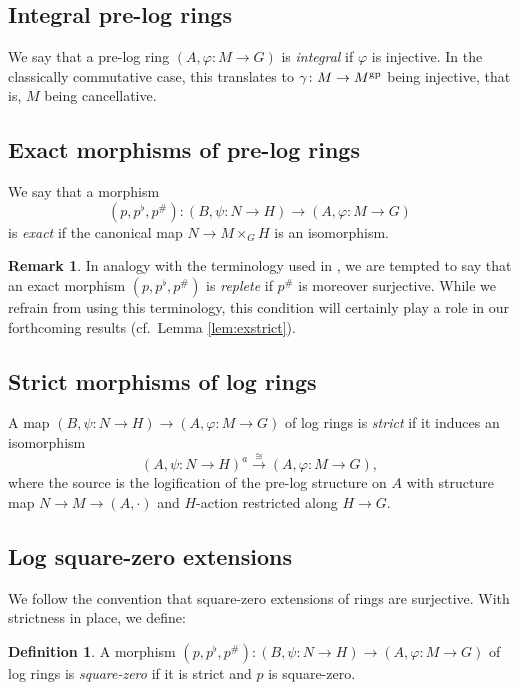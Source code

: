 \documentclass[a4paper,10pt%
]{amsart}
\numberwithin{equation}{section}
\theoremstyle{definition}
\newtheorem{definition}[subsection]{Definition}
\newtheorem{remark}[subsection]{Remark}
\renewcommand{\:}{\colon}
\begin{document}
\subsection{Integral pre-log rings} We say that a pre-log ring $(A, \varphi \colon M \to G)$ is \emph{integral} if $\varphi$ is injective. In the classically commutative case, this translates to $\gamma \colon M \to M^{\rm gp}$ being injective, that is, $M$ being cancellative. 

\subsection{Exact morphisms of pre-log rings} We say that a morphism \[(p, p^\flat, p^\#) \colon (B, \psi \colon N \to H) \to (A, \varphi \colon M \to G)\] is \emph{exact} if the canonical map $N \to M \times_G H$ is an isomorphism. 

\begin{remark} In analogy with the terminology used in \cite{Rog09}, we are tempted to say that an exact morphism $(p, p^\flat, p^\#)$ is \emph{replete} if $p^\#$ is moreover surjective. While we refrain from using this terminology, this condition will certainly play a role in our forthcoming results (cf.\ Lemma \ref{lem:exstrict}). 
\end{remark}
 
\subsection{Strict morphisms of log rings}\label{subsec:logsqzero} A map $(B, \psi \colon N \to H) \to (A, \varphi \colon M \to G)$ of log rings is \emph{strict} if it induces an isomorphism \[(A, \psi \colon N \to H)^a \xrightarrow{\cong} (A, \varphi \colon M \to G),\] where the source is the logification of the pre-log structure on $A$ with structure map $N \to M \to (A, \cdot)$ and $H$-action restricted along $H \to G$.   

\subsection{Log square-zero extensions} We follow the convention that square-zero extensions of rings are surjective. With strictness in place, we define:

\begin{definition} A morphism $(p, p^\flat, p^\#) \colon (B, \psi \colon N \to H) \to (A, \varphi \colon M \to G)$ of log rings is \emph{square-zero} if it is strict and $p$ is square-zero. 
\end{definition}
\end{document}
